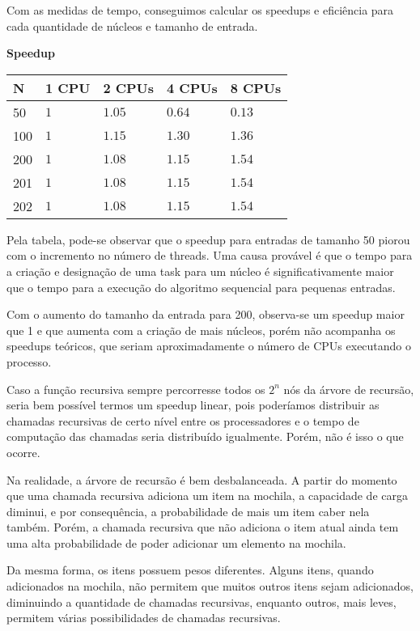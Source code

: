 \documentclass{article}
\begin{document}
Com as medidas de tempo, conseguimos calcular os speedups 
e eficiência para cada quantidade de núcleos e tamanho de 
entrada.

\textbf{Speedup}

\vspace{0.3cm}

\begin{tabular}{|l|l|l|l|l|}
\hline
N   & 1 CPU             & 2 CPUs            & 4 CPUs            & 8 CPUs \\ \hline
50  & $1$ & $1.05$ & $0.64$ & $0.13$ \\ \hline
100 & $1$ & $1.15$ & $1.30$ & $1.36$ \\ \hline
200 & $1$ & $1.08$ & $1.15$ & $1.54$ \\ \hline
201 & $1$ & $1.08$ & $1.15$ & $1.54$ \\ \hline
202 & $1$ & $1.08$ & $1.15$ & $1.54$ \\ \hline
\end{tabular}

\vspace{0.5cm}

Pela tabela, pode-se observar que o speedup para entradas
de tamanho 50 piorou com o incremento no número de threads.
Uma causa provável é que o tempo para a criação e designação
de uma task para um núcleo é significativamente maior que 
o tempo para a execução do algoritmo sequencial para 
pequenas entradas. 

Com o aumento do tamanho da entrada para 200, observa-se um
speedup maior que 1 e que aumenta com a criação de mais 
núcleos, porém não acompanha os speedups teóricos, que 
seriam aproximadamente o número de CPUs executando o 
processo.

Caso a função recursiva sempre percorresse todos os $2^n$ 
nós da árvore de recursão, seria bem possível termos um 
speedup linear, pois poderíamos distribuir as chamadas 
recursivas de certo nível entre os processadores e o tempo
de computação das chamadas seria distribuído igualmente. 
Porém, não é isso o que ocorre.

Na realidade, a árvore de recursão é bem desbalanceada.
A partir do momento que uma chamada recursiva adiciona 
um item na mochila, a capacidade de carga diminui, e por
consequência, a probabilidade de mais um item caber nela
também. Porém, a chamada recursiva que não adiciona o 
item atual ainda tem uma alta probabilidade de poder
adicionar um elemento na mochila.

Da mesma forma, os itens possuem pesos diferentes.
Alguns itens, quando adicionados na mochila, não permitem
que muitos outros itens sejam adicionados, diminuindo a 
quantidade de chamadas recursivas, enquanto outros, mais 
leves, permitem várias possibilidades de chamadas 
recursivas.
\end{document}
